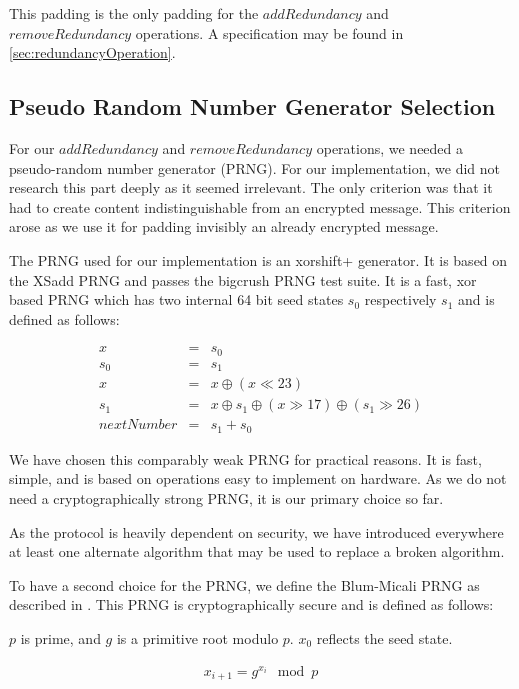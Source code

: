 This padding is the only padding for the $addRedundancy$ and $removeRedundancy$ operations. A specification may be found in \cref{sec:redundancyOperation}.

\subsection{Pseudo Random Number Generator Selection}\label{sec:prng}
For our $addRedundancy$ and $removeRedundancy$ operations, we needed a pseudo-random number generator (PRNG). For our implementation, we did not research this part deeply as it seemed irrelevant. The only criterion was that it had to create content indistinguishable from an encrypted message. This criterion arose as we use it for padding invisibly an already encrypted message.

The PRNG used for our implementation is an xorshift+ generator. It is based on the XSadd PRNG\cite{marsaglia2003xorshift} and passes the bigcrush PRNG test suite. It is a fast, xor based PRNG which has two internal 64 bit seed states $s_0$ respectively $s_1$ and is defined as follows:

\begin{eqnarray}
	x & = & s_0\\
	s_0 & = & s_1\\
	x & = & x \oplus ( x \ll 23 )\\
	s_1 & = & x \oplus s_1 \oplus ( x \gg 17 ) \oplus (s_1 \gg 26 )\\
	nextNumber & = & s_1+s_0
\end{eqnarray}

We have chosen this comparably weak PRNG for practical reasons. It is fast, simple, and is based on operations easy to implement on hardware. As we do not need a cryptographically strong PRNG, it is our primary choice so far. 

As the protocol is heavily dependent on security, we have introduced everywhere at least one alternate algorithm that may be used to replace a broken algorithm. 

To have a second choice for the PRNG, we define the Blum-Micali PRNG as described in \cite{blum1984generate}. This PRNG is cryptographically secure and is defined as follows:

$p$ is prime, and $g$ is a primitive root modulo $p$. $x_0$ reflects the seed state.

\begin{eqnarray}
	x_{i+1}=g^{x_i}\mod p
\end{eqnarray}

